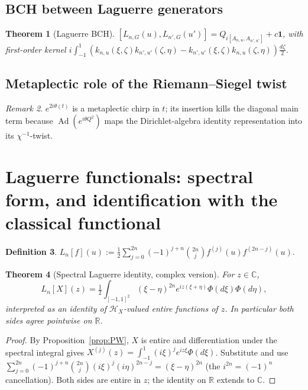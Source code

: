 \documentclass[11pt,reqno]{amsart}
\theoremstyle{plain}
\newtheorem{theorem}{Theorem}[section]
\theoremstyle{definition}
\newtheorem{definition}[theorem]{Definition}
\theoremstyle{remark}
\newtheorem{remark}[theorem]{Remark}
\DeclareMathOperator{\Ad}{Ad}
\newcommand{\Hc}{\mathcal H}
\newcommand{\R}{\mathbb R}
\newcommand{\C}{\mathbb C}
\begin{document}
\subsection{BCH between Laguerre generators}

\begin{theorem}[Laguerre BCH]\label{thm:bchlag}
\([L_{n,G}(u),L_{n',G}(u')]=Q_{i[A_{n,u},A_{n',u'}]}+c\mathbf 1\), with first-order
kernel
\(i\int_{-1}^{1}(k_{n,u}(\xi,\zeta)k_{n',u'}(\zeta,\eta)-k_{n',u'}(\xi,\zeta)k_{n,u}(\zeta,\eta))\tfrac{d\zeta}{2}\).
\end{theorem}

\subsection{Metaplectic role of the Riemann--Siegel twist}

\begin{remark}
\(e^{2i\theta(t)}\) is a metaplectic chirp in \(t\); its insertion kills
the diagonal main term because \(\Ad(e^{i\theta Q^2})\) maps the
Dirichlet-algebra identity representation into its \(\chi^{-1}\)-twist.
\end{remark}

\section{Laguerre functionals: spectral form, and identification with the
classical functional}

\begin{definition}
\(L_n[f](u):=\tfrac12\sum_{j=0}^{2n}(-1)^{j+n}\binom{2n}{j}f^{(j)}(u)f^{(2n-j)}(u)\).
\end{definition}

\begin{theorem}[Spectral Laguerre identity, complex version]\label{thm:laguerrespectral}
For \(z\in\C\),
\[
L_n[X](z)=\tfrac12\int_{[-1,1]^2}(\xi-\eta)^{2n}e^{iz(\xi+\eta)}
\Phi(d\xi)\Phi(d\eta),
\]
interpreted as an identity of \(\Hc_X\)-valued entire functions of \(z\).
In particular both sides agree pointwise on \(\R\).
\end{theorem}

\begin{proof}
By Proposition~\ref{prop:PW}, \(X\) is entire and differentiation under
the spectral integral gives
\(X^{(j)}(z)=\int_{-1}^{1}(i\xi)^j e^{iz\xi}\Phi(d\xi)\). Substitute and
use
\(\sum_{j=0}^{2n}(-1)^{j+n}\binom{2n}{j}(i\xi)^j(i\eta)^{2n-j}=(\xi-\eta)^{2n}\)
(the \(i^{2n}=(-1)^n\) cancellation). Both sides are entire in \(z\); the
identity on \(\R\) extends to \(\C\).
\end{proof}
\end{document}
